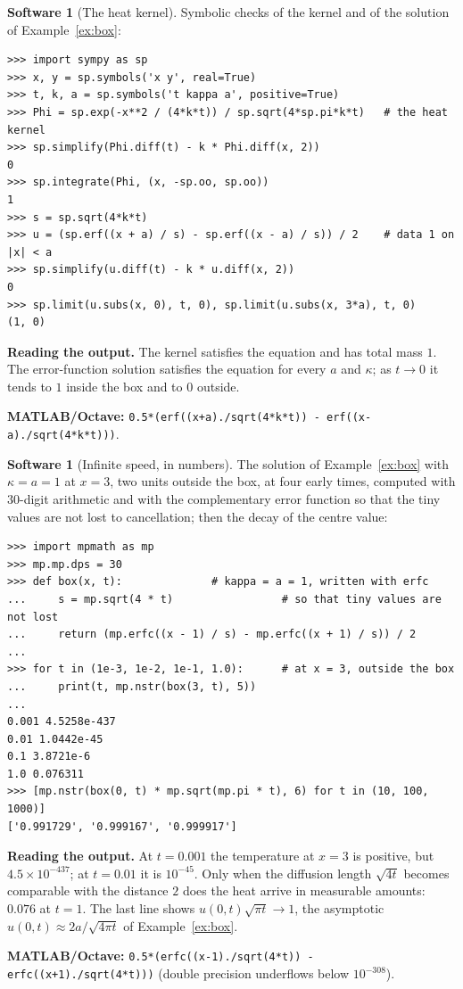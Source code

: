 \documentclass[11pt,a4paper]{article}
\numberwithin{equation}{section}
\theoremstyle{definition}
\newtheorem{software}[thm]{Software}
\begin{document}
\begin{software}[The heat kernel]
\label{sw:heatkernel}
Symbolic checks of the kernel and of the solution of Example~\ref{ex:box}:
{\small\begin{verbatim}
>>> import sympy as sp
>>> x, y = sp.symbols('x y', real=True)
>>> t, k, a = sp.symbols('t kappa a', positive=True)
>>> Phi = sp.exp(-x**2 / (4*k*t)) / sp.sqrt(4*sp.pi*k*t)   # the heat kernel
>>> sp.simplify(Phi.diff(t) - k * Phi.diff(x, 2))
0
>>> sp.integrate(Phi, (x, -sp.oo, sp.oo))
1
>>> s = sp.sqrt(4*k*t)
>>> u = (sp.erf((x + a) / s) - sp.erf((x - a) / s)) / 2    # data 1 on |x| < a
>>> sp.simplify(u.diff(t) - k * u.diff(x, 2))
0
>>> sp.limit(u.subs(x, 0), t, 0), sp.limit(u.subs(x, 3*a), t, 0)
(1, 0)
\end{verbatim}}
\textbf{Reading the output.} The kernel satisfies the equation and has total mass $1$. The error-function solution satisfies the equation for every $a$ and $\kappa$; as $t \to 0$ it tends to $1$ inside the box and to $0$ outside.

\textbf{MATLAB/Octave:} \texttt{0.5*(erf((x+a)./sqrt(4*k*t)) - erf((x-a)./sqrt(4*k*t)))}.
\end{software}

\begin{software}[Infinite speed, in numbers]
\label{sw:infinite}
The solution of Example~\ref{ex:box} with $\kappa = a = 1$ at $x = 3$, two units outside the box, at four early times, computed with $30$-digit arithmetic and with the complementary error function so that the tiny values are not lost to cancellation; then the decay of the centre value:
{\small\begin{verbatim}
>>> import mpmath as mp
>>> mp.mp.dps = 30
>>> def box(x, t):              # kappa = a = 1, written with erfc
...     s = mp.sqrt(4 * t)                 # so that tiny values are not lost
...     return (mp.erfc((x - 1) / s) - mp.erfc((x + 1) / s)) / 2
...
>>> for t in (1e-3, 1e-2, 1e-1, 1.0):      # at x = 3, outside the box
...     print(t, mp.nstr(box(3, t), 5))
...
0.001 4.5258e-437
0.01 1.0442e-45
0.1 3.8721e-6
1.0 0.076311
>>> [mp.nstr(box(0, t) * mp.sqrt(mp.pi * t), 6) for t in (10, 100, 1000)]
['0.991729', '0.999167', '0.999917']
\end{verbatim}}
\textbf{Reading the output.} At $t = 0.001$ the temperature at $x = 3$ is positive, but $4.5 \times 10^{-437}$; at $t = 0.01$ it is $10^{-45}$. Only when the diffusion length $\sqrt{4t}$ becomes comparable with the distance $2$ does the heat arrive in measurable amounts: $0.076$ at $t = 1$. The last line shows
$u(0, t)\sqrt{\pi t} \to 1$, the asymptotic $u(0, t) \approx 2a/\sqrt{4\pi t}$ of Example~\ref{ex:box}.

\textbf{MATLAB/Octave:} \texttt{0.5*(erfc((x-1)./sqrt(4*t)) - erfc((x+1)./sqrt(4*t)))} (double precision underflows below $10^{-308}$).
\end{software}
\end{document}
